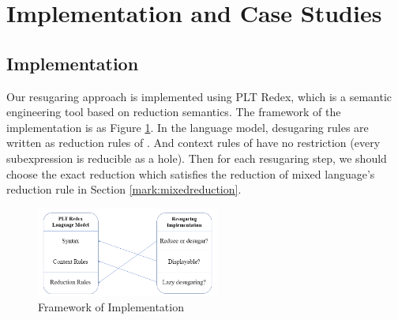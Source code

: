 \section{Implementation and Case Studies}
\label{sec5}


\subsection{Implementation}

Our resugaring approach is implemented using PLT Redex\cite{SEwPR}, which is a semantic engineering tool based on reduction semantics\cite{reduction}. The framework of the implementation is as Figure \ref{fig:frame}.
In the language model, desugaring rules are written as reduction rules of . And context rules of  have no restriction (every subexpression is reducible as a hole). Then for each resugaring step, we should choose the exact reduction which satisfies the reduction of mixed language's reduction rule  in Section \ref{mark:mixedreduction}.
\begin{figure}[t]
	\centering
	\includegraphics[width=6cm]{images/frame.png}
	\caption{Framework of Implementation}
	\label{fig:frame}
\end{figure}



